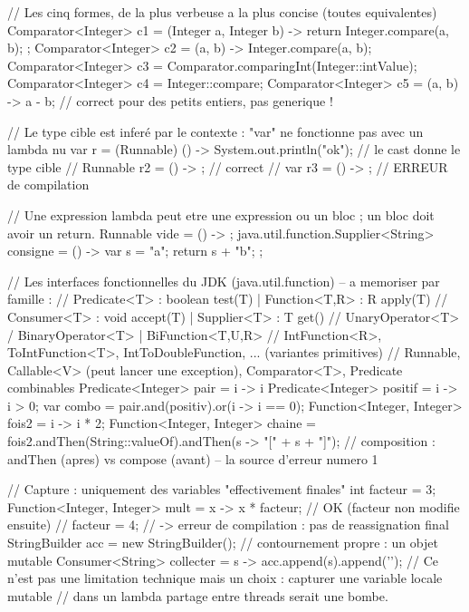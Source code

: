 \documentclass[12pt,a4paper,twoside,openright]{book}
\begin{document}
\begin{codejava}
// Les cinq formes, de la plus verbeuse a la plus concise (toutes equivalentes)
Comparator<Integer> c1 = (Integer a, Integer b) -> { return Integer.compare(a, b); };
Comparator<Integer> c2 = (a, b) -> Integer.compare(a, b);
Comparator<Integer> c3 = Comparator.comparingInt(Integer::intValue);
Comparator<Integer> c4 = Integer::compare;
Comparator<Integer> c5 = (a, b) -> a - b;             // correct pour des petits entiers, pas generique !

// Le type cible est infer\'e par le contexte : "var" ne fonctionne pas avec un lambda nu
var r = (Runnable) () -> System.out.println("ok");    // le cast donne le type cible
// Runnable r2 = () -> { };                             // correct
// var r3 = () -> { };                                  // ERREUR de compilation

// Une expression lambda peut etre une expression ou un bloc ; un bloc doit avoir un return.
Runnable vide = () -> { };
java.util.function.Supplier<String> consigne = () -> { var s = "a"; return s + "b"; };

// Les interfaces fonctionnelles du JDK (java.util.function) -- a memoriser par famille :
//   Predicate<T>  : boolean test(T)                 | Function<T,R> : R apply(T)
//   Consumer<T>   : void accept(T)                  | Supplier<T>   : T get()
//   UnaryOperator<T> / BinaryOperator<T>            | BiFunction<T,U,R>
//   IntFunction<R>, ToIntFunction<T>, IntToDoubleFunction, ... (variantes primitives)
//   Runnable, Callable<V> (peut lancer une exception), Comparator<T>, Predicate combinables
Predicate<Integer> pair = i -> i %
Predicate<Integer> positif = i -> i > 0;
var combo = pair.and(positiv).or(i -> i == 0);
Function<Integer, Integer> fois2 = i -> i * 2;
Function<Integer, Integer> chaine = fois2.andThen(String::valueOf).andThen(s -> "[" + s + "]");
// composition : andThen (apres) vs compose (avant) -- la source d'erreur numero 1

// Capture : uniquement des variables "effectivement finales"
int facteur = 3;
Function<Integer, Integer> mult = x -> x * facteur;      // OK (facteur non modifie ensuite)
// facteur = 4;                                           // -> erreur de compilation : pas de reassignation
final StringBuilder acc = new StringBuilder();            // contournement propre : un objet mutable
Consumer<String> collecter = s -> acc.append(s).append('\n');
// Ce n'est pas une limitation technique mais un choix : capturer une variable locale mutable
// dans un lambda partage entre threads serait une bombe.
\end{codejava}
\end{document}
